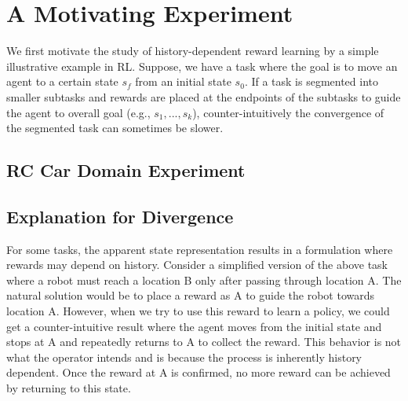 %

\section{A Motivating Experiment}
We first motivate the study of history-dependent reward learning by a simple illustrative example in RL.
Suppose, we have a task where the goal is to move an agent to a certain state $s_f$ from an initial state $s_0$.
If a task is segmented into smaller subtasks and rewards are placed at the endpoints of the subtasks to guide the agent to overall goal (e.g., $s_1,...,s_k$), counter-intuitively the convergence of the segmented task can sometimes be slower.

\subsection{RC Car Domain Experiment}

\subsection{Explanation for Divergence}
For some tasks, the apparent state representation results in a formulation where rewards may depend on history.
Consider a simplified version of the above task where a robot must reach a location B only after passing through location A.
The natural solution would be to place a reward as A to guide the robot towards location A.
However, when we try to use this reward to learn a policy, we could get a counter-intuitive result where the agent moves from the initial state and stops at A and repeatedly returns to A to collect the reward.
This behavior is not what the operator intends and is because the process is inherently history dependent.
Once the reward at A is confirmed, no more reward can be achieved by returning to this state.

%